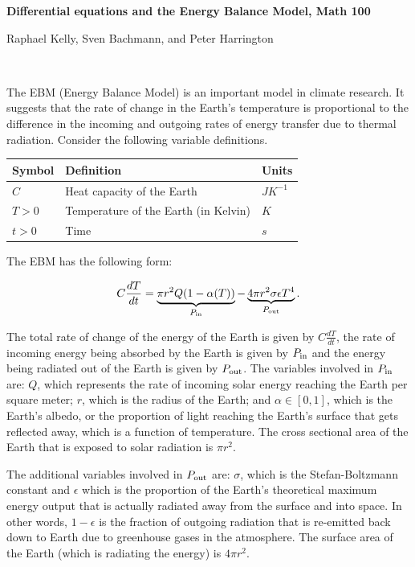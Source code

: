 \documentclass[answers]{exam}
\begin{document}
\large{\textbf{Differential equations and the Energy Balance Model, Math 100}}

Raphael Kelly, Sven Bachmann, and Peter Harrington

\normalsize
\hrulefill

\



The EBM (Energy Balance Model) is an important model in climate research. It suggests that the rate of change in the Earth's temperature is proportional to the difference in the incoming and outgoing rates of energy transfer due to thermal radiation. Consider the following variable definitions.
    
\begin{center}
\begin{tabular}{ l | l | l }
Symbol & Definition & Units \\
\hline \hline
$C$ & Heat capacity of the Earth & $J K^{-1}$\\  
$T > 0$ & Temperature of the Earth (in Kelvin) & $K$ \\
$t>0$ & Time & $s$ \\
\end{tabular}
\end{center}
The EBM has the following form:

\begin{equation}
    C \frac{d T}{d t} = \underbrace{\pi r^2 Q (1-\alpha(T))}_\text{$P_{\rm in}$} - \underbrace{4 \pi r^2 \sigma \epsilon T^4}_\text{$P_{\rm out}$}.
    \label{ebm}
\end{equation}


The total rate of change of the energy of the Earth is given by $C\frac{dT}{dt}$, the rate of incoming energy being absorbed by the Earth is given by $P_{\rm in}$ and the energy being radiated out of the Earth is given by $P_{\rm out}$. The variables involved in $P_{\rm in}$ are: $Q$, which represents the rate of incoming solar energy reaching the Earth per square meter; $r$, which is the radius of the Earth; and $\alpha \in [0,1]$, which is the Earth's albedo, or the proportion of light reaching the Earth's surface that gets reflected away, which is a function of temperature. The cross sectional area of the Earth that is exposed to solar radiation is $\pi r^2$.


The additional variables involved in $P_{\rm out}$ are: $\sigma$, which is the Stefan-Boltzmann constant and $\epsilon$ which is the proportion of the Earth's theoretical maximum energy output that is actually radiated away from the surface and into space. In other words, $1-\epsilon$ is the fraction of outgoing radiation that is re-emitted back down to Earth due to greenhouse gases in the atmosphere. The surface area of the Earth (which is radiating the energy) is $4\pi r^2$.
\end{document}
